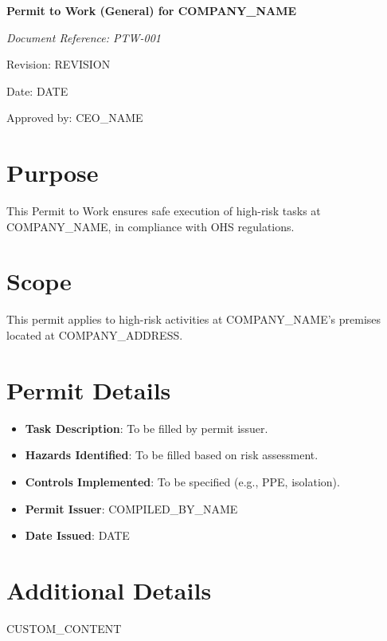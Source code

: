 \documentclass[12pt]{article}
\begin{document}
\begin{titlepage}
    \centering
    \vspace*{2cm}
    {\LARGE\bfseries Permit to Work (General) for {{COMPANY_NAME}}\par}
    \vspace{1cm}
    {\large\itshape Document Reference: PTW-001\par}
    \vspace{0.5cm}
    {\normalsize Revision: {{REVISION}}\par}
    \vspace{0.5cm}
    {\normalsize Date: {{DATE}}\par}
    \vspace{2cm}
    {\normalsize Approved by: {{CEO_NAME}}\par}
\end{titlepage}

\section{Purpose}
This Permit to Work ensures safe execution of high-risk tasks at {{COMPANY_NAME}}, in compliance with OHS regulations.

\section{Scope}
This permit applies to high-risk activities at {{COMPANY_NAME}}'s premises located at {{COMPANY_ADDRESS}}.

\section{Permit Details}
\begin{itemize}
    \item \textbf{Task Description}: To be filled by permit issuer.
    \item \textbf{Hazards Identified}: To be filled based on risk assessment.
    \item \textbf{Controls Implemented}: To be specified (e.g., PPE, isolation).
    \item \textbf{Permit Issuer}: {{COMPILED_BY_NAME}}
    \item \textbf{Date Issued}: {{DATE}}
\end{itemize}

\section{Additional Details}
{{CUSTOM_CONTENT}}
\end{document}

